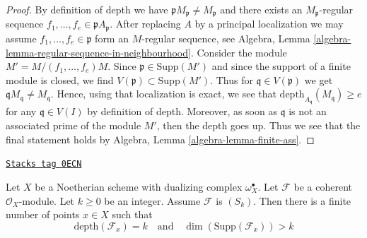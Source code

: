 \begin{proof}
By definition of depth we have $\mathfrak p M_\mathfrak p \not = M_\mathfrak p$
and there exists an $M_\mathfrak p$-regular sequence
$f_1, \ldots, f_e \in \mathfrak p A_\mathfrak p$. After replacing $A$ by
a principal localization we may assume $f_1, \ldots, f_e \in \mathfrak p$
form an $M$-regular sequence, see
Algebra, Lemma \ref{algebra-lemma-regular-sequence-in-neighbourhood}.
Consider the module $M' = M/(f_1, \ldots, f_e)M$.
Since $\mathfrak p \in \text{Supp}(M')$
and since the support of a finite module is closed, we find
$V(\mathfrak p) \subset \text{Supp}(M')$. Thus
for $\mathfrak q \in V(\mathfrak p)$ we get
$\mathfrak q M_\mathfrak q \not = M_\mathfrak q$. Hence, using that
localization is exact, we see that
$\text{depth}_{A_\mathfrak q}(M_\mathfrak q) \geq e$
for any $\mathfrak q \in V(I)$ by definition of depth.
Moreover, as soon as $\mathfrak q$ is not an associated
prime of the module $M'$, then the depth goes up.
Thus we see that the final statement holds by
Algebra, Lemma \ref{algebra-lemma-finite-ass}.
\end{proof}

\begin{lemma}
\label{local-cohomology-lemma-finite-nr-points-next-S}
\href{https://stacks.math.columbia.edu/tag/0ECN}{\texttt{Stacks tag 0ECN}}

Let $X$ be a Noetherian scheme with dualizing complex $\omega_X^\bullet$.
Let $\mathcal{F}$ be a coherent $\mathcal{O}_X$-module. Let $k \geq 0$
be an integer. Assume $\mathcal{F}$ is $(S_k)$.
Then there is a finite number of points $x \in X$ such that
$$
\text{depth}(\mathcal{F}_x) = k
\quad\text{and}\quad
\dim(\text{Supp}(\mathcal{F}_x)) > k
$$
\end{lemma}

